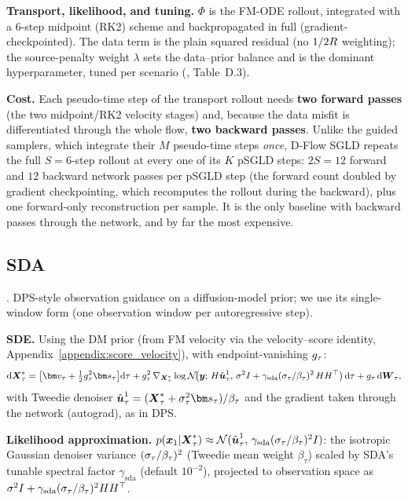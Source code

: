 \textbf{Transport, likelihood, and tuning.}
$\Phi$ is the FM-ODE rollout, integrated with a $6$-step midpoint (RK2) scheme and backpropagated in full (gradient-checkpointed). The data term is the plain squared residual (no $1/2R$ weighting); the source-penalty weight $\lambda$ sets the data--prior balance and is the dominant hyperparameter, tuned per scenario (\cite{parikh_d-flow_2026}, Table~D.3).

\textbf{Cost.}
Each pseudo-time step of the transport rollout needs \textbf{two forward passes} (the two midpoint/RK2 velocity stages) and, because the data misfit is differentiated through the whole flow, \textbf{two backward passes}. Unlike the guided samplers, which integrate their $M$ pseudo-time steps \emph{once}, D-Flow SGLD repeats the full $S=6$-step rollout at every one of its $K$ pSGLD steps: $2S=12$ forward and $12$ backward network passes per pSGLD step (the forward count doubled by gradient checkpointing, which recomputes the rollout during the backward), plus one forward-only reconstruction per sample. It is the only baseline with backward passes through the network, and by far the most expensive.

\subsection{SDA}\label{appendix:method:sda}

\cite{rozet_score-based_2023}. DPS-style observation guidance on a diffusion-model prior; we use its single-window form (one observation window per autoregressive step).

\textbf{SDE.}
Using the DM prior (from FM velocity via the velocity--score identity, Appendix~\ref{appendix:score_velocity}),
with endpoint-vanishing $g_\tau$:
\begin{align}
  \rd\bXstar_\tau
  = \bigl[\fmvel_\tau + \tfrac12\gdiff_\tau^2\genscore_\tau\bigr]\rd\tau
  + \gdiff_\tau^2\,\nabla_{\bXstar_\tau}\log\mathcal{N}\!\bigl(\obs;\,\obsmatrix\hat{\state}^1_\tau,\,
    \sigma^2 I + \gamma_{\mathrm{sda}}(\sigpath_\tau/\beta_\tau)^2\,\obsmatrix\obsmatrix^\top\bigr)\,\rd\tau
  + \gdiff_\tau\,\rd\bW_\tau,
\end{align}
with Tweedie denoiser $\hat{\state}^1_\tau = (\bXstar_\tau + \sigpath_\tau^2\genscore_\tau)/\beta_\tau$ and the gradient taken through the network (autograd), as in DPS.

\textbf{Likelihood approximation.}
$p(\boldsymbol{x}_1|\boldsymbol{X}^{*}_\tau)\approx\mathcal{N}(\hat{\boldsymbol{u}}^1_\tau,\,\gamma_{\mathrm{sda}}(\sigma_\tau/\beta_\tau)^2 I)$: the isotropic Gaussian denoiser variance $(\sigma_\tau/\beta_\tau)^2$ (Tweedie mean weight $\beta_\tau$) scaled by SDA's tunable spectral factor $\gamma_{\mathrm{sda}}$ (default $10^{-2}$), projected to observation space as $\sigma^2 I + \gamma_{\mathrm{sda}}(\sigma_\tau/\beta_\tau)^2HH^\top$.

